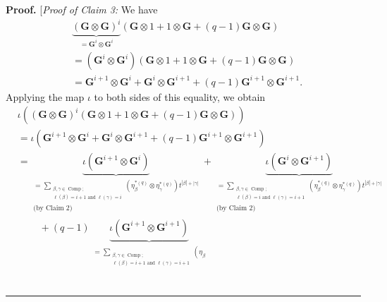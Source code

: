 \documentclass[numbers=enddot,12pt,final,onecolumn,notitlepage]{scrartcl}%
\theoremstyle{definition}
\newenvironment{proof}[1][Proof]{\noindent\textbf{#1.} }{\ \rule{0.5em}{0.5em}}
\let\sumnonlimits\sum
\renewcommand{\sum}{\sumnonlimits\limits}
\begin{document}
\begin{proof}
[\textit{Proof of Claim 3:} We have%
\begin{align*}
&  \underbrace{\left(  \mathbf{G}\otimes\mathbf{G}\right)  ^{i}}%
_{=\mathbf{G}^{i}\otimes\mathbf{G}^{i}}\left(  \mathbf{G}\otimes
1+1\otimes\mathbf{G}+\left(  q-1\right)  \mathbf{G}\otimes\mathbf{G}\right) \\
&  =\left(  \mathbf{G}^{i}\otimes\mathbf{G}^{i}\right)  \left(  \mathbf{G}%
\otimes1+1\otimes\mathbf{G}+\left(  q-1\right)  \mathbf{G}\otimes
\mathbf{G}\right) \\
&  =\mathbf{G}^{i+1}\otimes\mathbf{G}^{i}+\mathbf{G}^{i}\otimes\mathbf{G}%
^{i+1}+\left(  q-1\right)  \mathbf{G}^{i+1}\otimes\mathbf{G}^{i+1}.
\end{align*}
Applying the map $\iota$ to both sides of this equality, we obtain%
\begin{align}
&  \iota\left(  \left(  \mathbf{G}\otimes\mathbf{G}\right)  ^{i}\left(
\mathbf{G}\otimes1+1\otimes\mathbf{G}+\left(  q-1\right)  \mathbf{G}%
\otimes\mathbf{G}\right)  \right) \nonumber\\
&  =\iota\left(  \mathbf{G}^{i+1}\otimes\mathbf{G}^{i}+\mathbf{G}^{i}%
\otimes\mathbf{G}^{i+1}+\left(  q-1\right)  \mathbf{G}^{i+1}\otimes
\mathbf{G}^{i+1}\right) \nonumber\\
&  =\underbrace{\iota\left(  \mathbf{G}^{i+1}\otimes\mathbf{G}^{i}\right)
}_{\substack{=\sum_{\substack{\beta,\gamma\in\operatorname*{Comp}%
;\\\ell\left(  \beta\right)  =i+1\text{ and }\ell\left(  \gamma\right)
=i}}\left(  \eta_{\beta}^{\ast\left(  q\right)  }\otimes\eta_{\gamma}%
^{\ast\left(  q\right)  }\right)  t^{\left\vert \beta\right\vert +\left\vert
\gamma\right\vert }\\\text{(by Claim 2)}}}+\underbrace{\iota\left(
\mathbf{G}^{i}\otimes\mathbf{G}^{i+1}\right)  }_{\substack{=\sum
_{\substack{\beta,\gamma\in\operatorname*{Comp};\\\ell\left(  \beta\right)
=i\text{ and }\ell\left(  \gamma\right)  =i+1}}\left(  \eta_{\beta}%
^{\ast\left(  q\right)  }\otimes\eta_{\gamma}^{\ast\left(  q\right)  }\right)
t^{\left\vert \beta\right\vert +\left\vert \gamma\right\vert }\\\text{(by
Claim 2)}}}\nonumber\\
&  \ \ \ \ \ \ \ \ \ \ +\left(  q-1\right)  \underbrace{\iota\left(
\mathbf{G}^{i+1}\otimes\mathbf{G}^{i+1}\right)  }_{\substack{=\sum
_{\substack{\beta,\gamma\in\operatorname*{Comp};\\\ell\left(  \beta\right)
=i+1\text{ and }\ell\left(  \gamma\right)  =i+1}}\left(  \eta_{\beta}%
}}
\end{align}
\end{proof}
\end{document}
